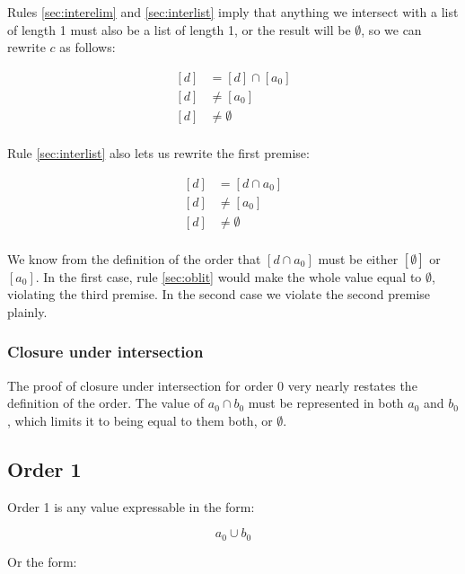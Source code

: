 \documentclass[letterpaper]{article}
\begin{document}
Rules \ref{sec:interelim} and \ref{sec:interlist} imply that anything we
intersect with a list of length 1 must also be a list of length 1, or the
result will be \(\emptyset\), so we can rewrite \(c\) as follows:

\begin{equation}
\begin{split}
[d] &= [d] \cap [a_0] \\
[d] &\neq [a_0] \\
[d] &\neq \emptyset \\
\end{split}
\end{equation}

Rule \ref{sec:interlist} also lets us rewrite the first premise:

\begin{equation}
\begin{split}
[d] &= [d \cap a_0] \\
[d] &\neq [a_0] \\
[d] &\neq \emptyset \\
\end{split}
\end{equation}

We know from the definition of the order that \([d \cap a_0]\) must be either
\([\emptyset]\) or \([a_0]\). In the first case, rule \ref{sec:oblit} would
make the whole value equal to \(\emptyset\), violating the third premise. In
the second case we violate the second premise plainly.

\subsubsection{Closure under intersection}

The proof of closure under intersection for order 0 very nearly restates the
definition of the order. The value of \(a_0 \cap b_0\) must be represented in
both \(a_0\) and \(b_0\), which limits it to being equal to them both, or
\(\emptyset\).

\subsection{Order 1}

Order 1 is any value expressable in the form:

\begin{equation}
a_0 \cup b_0
\end{equation}

Or the form:
\end{document}
